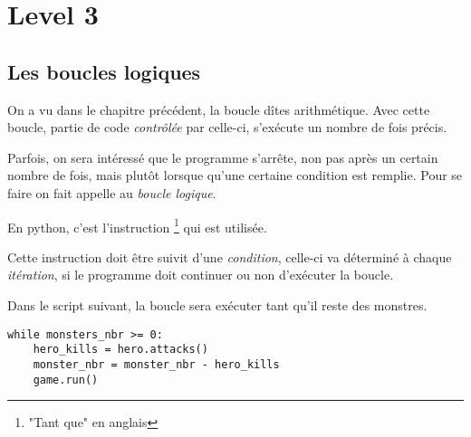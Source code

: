 






\chapter{Level 3}

\section{Les boucles logiques}

On a vu dans le chapitre précédent, la boucle dîtes arithmétique. Avec cette boucle, partie de code \emph{contrôlée} par celle-ci, s'exécute un nombre de fois précis.

Parfois, on sera intéressé que le programme s'arrête, non pas après un certain nombre de fois, mais plutôt lorsque qu'une certaine condition est remplie. Pour se faire on fait appelle au \emph{boucle logique}.

En python, c'est l'instruction \footnote{"Tant que" en anglais} qui est utilisée.

Cette instruction doit être suivit d'une \emph{condition}, celle-ci va déterminé à chaque \emph{itération}, si le programme doit continuer ou non d'exécuter la boucle.

Dans le script suivant, la boucle sera exécuter tant qu'il reste des monstres.

\begin{lstlisting}
while monsters_nbr >= 0:
	hero_kills = hero.attacks()
	monster_nbr = monster_nbr - hero_kills
	game.run()
\end{lstlisting}


